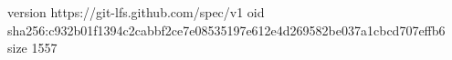 version https://git-lfs.github.com/spec/v1
oid sha256:c932b01f1394c2cabbf2ce7e08535197e612e4d269582be037a1cbcd707effb6
size 1557
